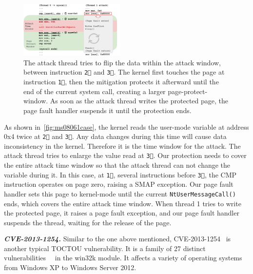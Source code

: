 \begin{figure}[th]
  \includegraphics[width=0.47\textwidth]{figures/ms08061case2}
  \centering
  \caption{The attack thread tries to flip the data within the attack window, between instruction \texttt{\textcircled{2}} and \texttt{\textcircled{3}}. The kernel first touches the page at instruction \texttt{\textcircled{1}}, then the mitigation protects it afterward until the end of the current system call, creating a larger page-protect-window. As soon as the attack thread writes the protected page, the page fault handler suspends it until the protection ends.}
  \label{fig:ms08061case}
\end{figure}


As shown in~\autoref{fig:ms08061case}, the kernel reads the user-mode variable at address 0x4 twice at \texttt{\textcircled{2}} and \texttt{\textcircled{3}}. Any data changes during this time will cause data inconsistency in the kernel. Therefore it is the time window for the attack. The attack thread tries to enlarge the value read at \texttt{\textcircled{3}}. Our protection needs to cover the entire attack time window so that the attack thread can not change the variable during it. In this case, at \texttt{\textcircled{1}}, several instructions before \texttt{\textcircled{3}}, the CMP instruction operates on page zero, raising a SMAP exception. Our page fault handler sets this page to kernel-mode until the current \texttt{NtUserMessageCall()} ends, which covers the entire attack time window. When thread 1 tries to write the protected page, it raises a page fault exception, and our page fault handler suspends the thread, waiting for the release of the page.




\textbf{\textit{CVE-2013-1254.}} Similar to the one above mentioned, CVE-2013-1254~\cite{CVE-2013-1254} is another typical TOCTOU vulnerability. It is a family of 27 distinct vulnerabilities~\cite{ms13016}~\cite{jurczyk2013identifying} in the win32k module. It affects a variety of operating systems from Windows XP to Windows Server 2012.


